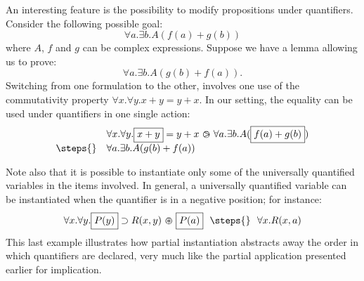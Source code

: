 An interesting feature is the possibility to modify propositions under
quantifiers. Consider the following possible goal:
$$\forall a.\exists b. A(f(a)+g(b))$$
where $A$, $f$ and $g$ can be complex expressions. Suppose we have a
lemma allowing us to prove:
$$\forall a.\exists b. A(g(b)+ f(a)).$$
Switching from one formulation to the other, involves one use of the
commutativity property $\forall x.\forall y. x+y=y+x$.
In our setting, the equality can be used under quantifiers in one single action:
$$
\begin{array}{ll}
  &\forall x.\forall y. \select{x+y}=y+x \back \forall a.\exists b. A(\select{f(a)+g(b)})\\
\steps{} & \forall a.\exists b. A(g(b)+f(a))
\end{array}$$


Note also that it is possible to instantiate only some of the universally
quantified variables in the items involved. In general, a universally
quantified variable can be instantiated when the quantifier is in a
negative position; for instance:
$$
\begin{array}{rcl}
 \forall x.\forall
 y. \select{P(y)}\limp R(x,y)\forw \select{P(a)} ~\/~\steps{}
~\/~ \forall x. R(x,a)
\end{array}
$$
This last example illustrates how partial instantiation abstracts away the order
in which quantifiers are declared, very much like the partial application
presented earlier for implication.


